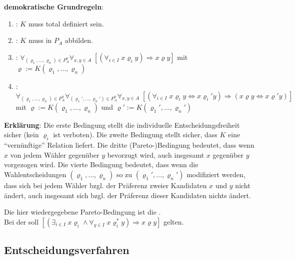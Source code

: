 \textbf{demokratische Grundregeln}:
\begin{enumerate}
    \item
    :
    $K$ muss total definiert sein.

    \item
    :
    $K$ muss in $P_A$ abbilden.

    \item
    :
    $\forall_{(\varrho_1, \dotsc, \varrho_n) \in P_A^n}
    \forall_{x, y \in A}\;
    [(\forall_{i \in I}\; x \varrho_i y) \Rightarrow x \varrho y]$
    mit $\varrho := K(\varrho_1, \dotsc, \varrho_n)$

    \item
    :\\
    $\forall_{(\varrho_1, \dotsc, \varrho_n) \in P_A^n}
    \forall_{(\varrho_1', \dotsc, \varrho_n') \in P_A^n}
    \forall_{x, y \in A}\;
    [(\forall_{i \in I}\; x \varrho_i y \Leftrightarrow x \varrho_i' y) \Rightarrow
    (x \varrho y \Leftrightarrow x \varrho' y)]$\\
    mit $\varrho := K(\varrho_1, \dotsc, \varrho_n)$
    und $\varrho' := K(\varrho_1', \dotsc, \varrho_n')$
\end{enumerate}

\textbf{Erklärung}:
Die erste Bedingung stellt die individuelle Entscheidungsfreiheit sicher
(kein $\varrho_i$ ist verboten).
Die zweite Bedingung stellt sicher, dass $K$ eine "`vernünftige"' Relation liefert.
Die dritte (Pareto-)Bedingung bedeutet, dass wenn $x$ von jedem Wähler gegenüber $y$
bevorzugt wird, auch insgesamt $x$ gegenüber $y$ vorgezogen wird.
Die vierte Bedingung bedeutet, dass wenn die Wahlentscheidungen $(\varrho_1, \dotsc, \varrho_n)$
so zu $(\varrho_1', \dotsc, \varrho_n')$ modifiziert werden, dass sich bei jedem Wähler
bzgl. der Präferenz zweier Kandidaten $x$ und $y$ nicht ändert, auch insgesamt sich bzgl. der
Präferenz dieser Kandidaten nichts ändert.

Die hier wiedergegebene Pareto-Bedingung ist die .\\
Bei der  soll
$[(\exists_{i \in I}\; x \varrho_i  \land \forall_{y \in I}\; x \varrho_i^\ast y)
\Rightarrow x \varrho y]$ gelten.

\pagebreak

\subsection{%
    Entscheidungsverfahren%
}

